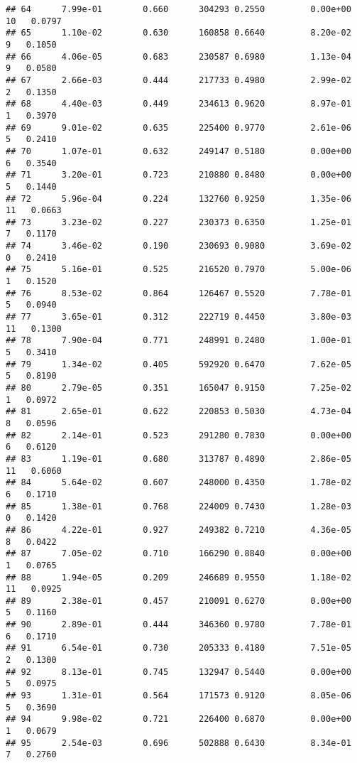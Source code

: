 \documentclass[
]{article}
\begin{document}
\begin{verbatim}
## 64      7.99e-01        0.660      304293 0.2550         0.00e+00  10   0.0797
## 65      1.10e-02        0.630      160858 0.6640         8.20e-02   9   0.1050
## 66      4.06e-05        0.683      230587 0.6980         1.13e-04   9   0.0580
## 67      2.66e-03        0.444      217733 0.4980         2.99e-02   2   0.1350
## 68      4.40e-03        0.449      234613 0.9620         8.97e-01   1   0.3970
## 69      9.01e-02        0.635      225400 0.9770         2.61e-06   5   0.2410
## 70      1.07e-01        0.632      249147 0.5180         0.00e+00   6   0.3540
## 71      3.20e-01        0.723      210880 0.8480         0.00e+00   5   0.1440
## 72      5.96e-04        0.224      132760 0.9250         1.35e-06  11   0.0663
## 73      3.23e-02        0.227      230373 0.6350         1.25e-01   7   0.1170
## 74      3.46e-02        0.190      230693 0.9080         3.69e-02   0   0.2410
## 75      5.16e-01        0.525      216520 0.7970         5.00e-06   1   0.1520
## 76      8.53e-02        0.864      126467 0.5520         7.78e-01   5   0.0940
## 77      3.65e-01        0.312      222719 0.4450         3.80e-03  11   0.1300
## 78      7.90e-04        0.771      248991 0.2480         1.00e-01   5   0.3410
## 79      1.34e-02        0.405      592920 0.6470         7.62e-05   5   0.8190
## 80      2.79e-05        0.351      165047 0.9150         7.25e-02   1   0.0972
## 81      2.65e-01        0.622      220853 0.5030         4.73e-04   8   0.0596
## 82      2.14e-01        0.523      291280 0.7830         0.00e+00   6   0.6120
## 83      1.19e-01        0.680      313787 0.4890         2.86e-05  11   0.6060
## 84      5.64e-02        0.607      248000 0.4350         1.78e-02   6   0.1710
## 85      1.38e-01        0.768      224009 0.7430         1.28e-03   0   0.1420
## 86      4.22e-01        0.927      249382 0.7210         4.36e-05   8   0.0422
## 87      7.05e-02        0.710      166290 0.8840         0.00e+00   1   0.0765
## 88      1.94e-05        0.209      246689 0.9550         1.18e-02  11   0.0925
## 89      2.38e-01        0.457      210091 0.6270         0.00e+00   5   0.1160
## 90      2.89e-01        0.444      346360 0.9780         7.78e-01   6   0.1710
## 91      6.54e-01        0.730      205333 0.4180         7.51e-05   2   0.1300
## 92      8.13e-01        0.745      132947 0.5440         0.00e+00   5   0.0975
## 93      1.31e-01        0.564      171573 0.9120         8.05e-06   5   0.3690
## 94      9.98e-02        0.721      226400 0.6870         0.00e+00   1   0.0679
## 95      2.54e-03        0.696      502888 0.6430         8.34e-01   7   0.2760

\end{verbatim}
\end{document}
